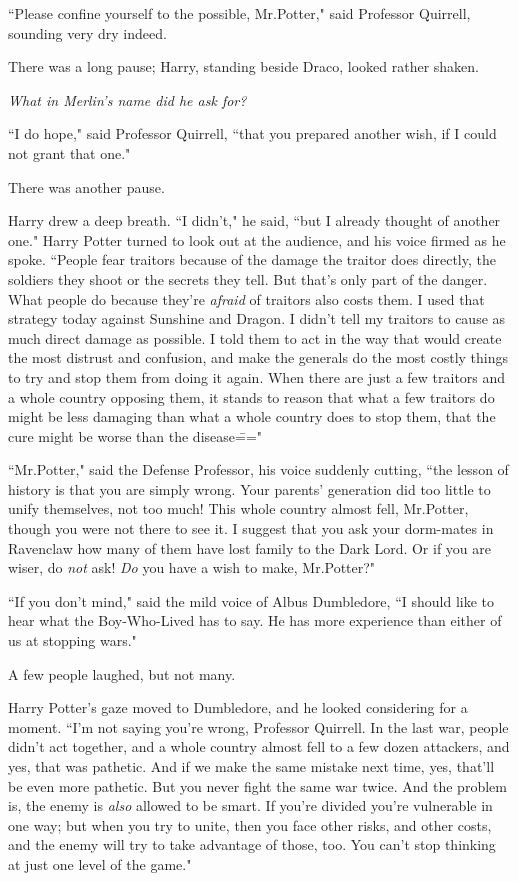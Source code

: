 ``Please confine yourself to the possible, Mr.\?Potter," said Professor Quirrell, sounding very dry indeed.

There was a long pause; Harry, standing beside Draco, looked rather shaken.

\emph{What in Merlin's name did he ask for?}

``I do hope," said Professor Quirrell, ``that you prepared another wish, if I could not grant that one."

There was another pause.

Harry drew a deep breath. ``I didn't," he said, ``but I already thought of another one." Harry Potter turned to look out at the audience, and his voice firmed as he spoke. ``People fear traitors because of the damage the traitor does directly, the soldiers they shoot or the secrets they tell. But that's only part of the danger. What people do because they're \emph{afraid} of traitors also costs them. I used that strategy today against Sunshine and Dragon. I didn't tell my traitors to cause as much direct damage as possible. I told them to act in the way that would create the most distrust and confusion, and make the generals do the most costly things to try and stop them from doing it again. When there are just a few traitors and a whole country opposing them, it stands to reason that what a few traitors do might be less damaging than what a whole country does to stop them, that the cure might be worse than the disease\==="

``Mr.\?Potter," said the Defense Professor, his voice suddenly cutting, ``the lesson of history is that you are simply wrong. Your parents' generation did too little to unify themselves, not too much! This whole country almost fell, Mr.\?Potter, though you were not there to see it. I suggest that you ask your dorm-mates in Ravenclaw how many of them have lost family to the Dark Lord. Or if you are wiser, do \emph{not} ask! \emph{Do} you have a wish to make, Mr.\?Potter?"

``If you don't mind," said the mild voice of Albus Dumbledore, ``I should like to hear what the Boy-Who-Lived has to say. He has more experience than either of us at stopping wars."

A few people laughed, but not many.

Harry Potter's gaze moved to Dumbledore, and he looked considering for a moment. ``I'm not saying you're wrong, Professor Quirrell. In the last war, people didn't act together, and a whole country almost fell to a few dozen attackers, and yes, that was pathetic. And if we make the same mistake next time, yes, that'll be even more pathetic. But you never fight the same war twice. And the problem is, the enemy is \emph{also} allowed to be smart. If you're divided you're vulnerable in one way; but when you try to unite, then you face other risks, and other costs, and the enemy will try to take advantage of those, too. You can't stop thinking at just one level of the game."

